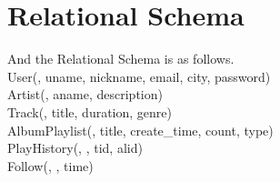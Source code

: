 \documentclass[letter, 12pt]{report}
\begin{document}
	\section{Relational Schema}
	And the Relational Schema is as follows.\\
	User(\underline{}, uname, nickname, email, city, password)\\
	Artist(\underline{}, aname, description)\\
	Track(\underline{}, title, duration, genre)\\
	AlbumPlaylist(\underline{}, title, create\_time, count, type)\\
	PlayHistory(\underline{}, \underline{}, tid, alid)\\
	Follow(\underline{}, \underline{}, time)\\
	
\end{document}
